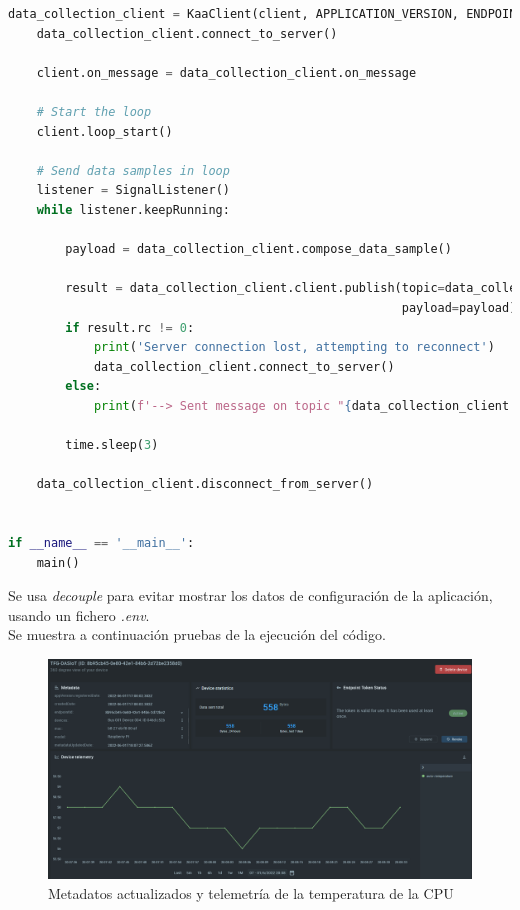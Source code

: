 {\begin{lstlisting}[language=Python]
    data_collection_client = KaaClient(client, APPLICATION_VERSION, ENDPOINT_TOKEN, KPC_HOST, KPC_PORT)
    data_collection_client.connect_to_server()

    client.on_message = data_collection_client.on_message

    # Start the loop
    client.loop_start()

    # Send data samples in loop
    listener = SignalListener()
    while listener.keepRunning:

        payload = data_collection_client.compose_data_sample()

        result = data_collection_client.client.publish(topic=data_collection_client.data_collection_topic,
                                                       payload=payload)
        if result.rc != 0:
            print('Server connection lost, attempting to reconnect')
            data_collection_client.connect_to_server()
        else:
            print(f'--> Sent message on topic "{data_collection_client.data_collection_topic}":\n{payload}')

        time.sleep(3)

    data_collection_client.disconnect_from_server()


if __name__ == '__main__':
    main()


\end{lstlisting}

Se usa \textit{decouple} para evitar mostrar los datos de configuración de la aplicación, usando un fichero \textit{.env}. \\

Se muestra a continuación pruebas de la ejecución del código.


\begin{figure}[p]
    \centering
    \includegraphics[width=\linewidth]{imagenes/data-execution.png}
    \caption{Metadatos actualizados y telemetría de la temperatura de la CPU}
    \label{fig:figure13}
\end{figure}

}
